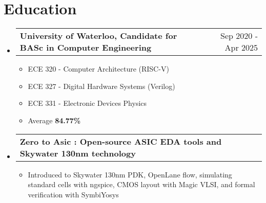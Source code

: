 \documentclass[letterpaper,11pt]{article}
\makeatletter
\newcommand{\resumeItem}[1]{
  \item\small{
    {#1 \vspace{-1pt}}
  }
}
\newcommand{\resumeEducationHeading}[2]{
  \vspace{-2pt}\item
    \begin{tabular*}{0.97\textwidth}[t]{l@{\extracolsep{\fill}}r}
      \textbf{#1} & {\small #2}
    \end{tabular*}\vspace{-5pt}
}
\newcommand{\resumeSubHeadingListStart}{\begin{itemize}[leftmargin=0pt, label={}]}
\newcommand{\resumeSubHeadingListEnd}{\end{itemize}}
\newcommand{\resumeItemListStart}{\begin{itemize}[leftmargin=0.2in, label={-}]}
\newcommand{\resumeItemListEnd}{\end{itemize}\vspace{-5pt}}
\newcommand{\resumeSectionName}[1]{\section{#1}\vspace{2pt}}
\makeatother
\begin{document}
\resumeSectionName{Education}
  \resumeSubHeadingListStart
    \resumeEducationHeading
      {University of Waterloo, Candidate for BASc in Computer Engineering
      }{Sep 2020 - Apr 2025}
      \vspace{-4pt}
    \begin{multicols}{2}
    \begin{itemize}[label={-}]
    \setlength\itemsep{-1pt}
    \item ECE 320 - Computer Architecture (RISC-V)
    \item ECE 327 - Digital Hardware Systems (Verilog)
    \end{itemize}
    \columnbreak
    \begin{itemize}[label={-}]
    \setlength\itemsep{-1pt}
    \item ECE 331 - Electronic Devices Physics 
    \item Average \textbf{84.77\%}
    \end{itemize}
    \end{multicols}
    \vspace{-13pt}

     \resumeEducationHeading
      {Zero to Asic : Open-source ASIC EDA tools and Skywater 130nm technology
      }{}
        \resumeItemListStart
            \resumeItem{Introduced to Skywater 130nm PDK, OpenLane flow, simulating standard cells with ngspice, CMOS layout with Magic VLSI, and formal verification with SymbiYosys}
        \resumeItemListEnd
    \resumeSubHeadingListEnd
\end{document}
